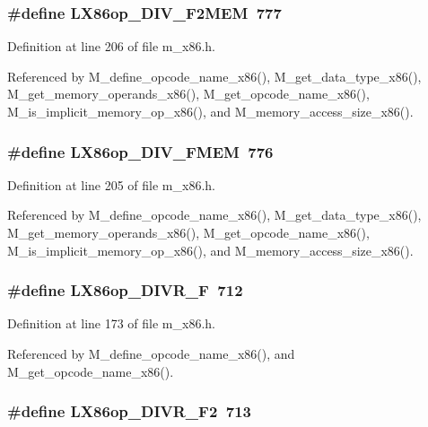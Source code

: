 \subsubsection{\setlength{\rightskip}{0pt plus 5cm}\#define LX86op\_\-DIV\_\-F2MEM~777}\label{m__x86_8h_e5b05ec5f7942f7921abd94274413f45}




Definition at line 206 of file m\_\-x86.h.

Referenced by M\_\-define\_\-opcode\_\-name\_\-x86(), M\_\-get\_\-data\_\-type\_\-x86(), M\_\-get\_\-memory\_\-operands\_\-x86(), M\_\-get\_\-opcode\_\-name\_\-x86(), M\_\-is\_\-implicit\_\-memory\_\-op\_\-x86(), and M\_\-memory\_\-access\_\-size\_\-x86().
\subsubsection{\setlength{\rightskip}{0pt plus 5cm}\#define LX86op\_\-DIV\_\-FMEM~776}\label{m__x86_8h_2d5ee52ab2fd9cb444fcbfc5a326e2d5}




Definition at line 205 of file m\_\-x86.h.

Referenced by M\_\-define\_\-opcode\_\-name\_\-x86(), M\_\-get\_\-data\_\-type\_\-x86(), M\_\-get\_\-memory\_\-operands\_\-x86(), M\_\-get\_\-opcode\_\-name\_\-x86(), M\_\-is\_\-implicit\_\-memory\_\-op\_\-x86(), and M\_\-memory\_\-access\_\-size\_\-x86().
\subsubsection{\setlength{\rightskip}{0pt plus 5cm}\#define LX86op\_\-DIVR\_\-F~712}\label{m__x86_8h_ded58d986ae9eeff22b6afa7919f33ab}




Definition at line 173 of file m\_\-x86.h.

Referenced by M\_\-define\_\-opcode\_\-name\_\-x86(), and M\_\-get\_\-opcode\_\-name\_\-x86().
\subsubsection{\setlength{\rightskip}{0pt plus 5cm}\#define LX86op\_\-DIVR\_\-F2~713}\label{m__x86_8h_408397c96c20217fb58058e2fa148ca6}




